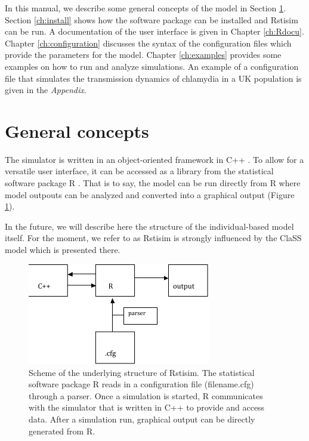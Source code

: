 \documentclass[11pt]{article}
\begin{document}
In this manual, we describe some general concepts of the model in Section \ref{ch:concepts}. Section \ref{ch:install} shows how the software package can be installed and Rstisim can be run. A documentation of the user interface is given in Chapter \ref{ch:Rdocu}. Chapter \ref{ch:configuration} discusses the syntax of the configuration files which provide the parameters for the model. Chapter \ref{ch:examples} provides some examples on how to run and analyze simulations. An example of a configuration file that simulates the transmission dynamics of chlamydia in a UK population is given in the \emph{Appendix}.

\section{General concepts}
\label{ch:concepts}
The simulator is written in an object-oriented framework in C++ \citep{Stroustrup:2000}. To allow for a versatile user interface, it can be accessed as a library from the statistical software package R \citep{R:2008}. That is to say, the model can be run directly from R where model outpouts can be analyzed and converted into a graphical output (Figure \ref{fig:scheme}).

In the future, we will describe here the structure of the individual-based model itself. For the moment, we refer to \citet{Low:2007} as Rstisim is strongly influenced by the ClaSS model which is presented there.

\begin{figure}[h]
\begin{center}
\includegraphics[width=8cm]{figures/scheme}
\end{center}
\caption{Scheme of the underlying structure of Rstisim. The statistical software package R reads in a configuration file (filename.cfg) through a parser. Once a simulation is started, R communicates with the simulator that is written in C++ to provide and access data. After a simulation run, graphical output can be directly generated from R.}
\label{fig:scheme}
\end{figure}
\end{document}
